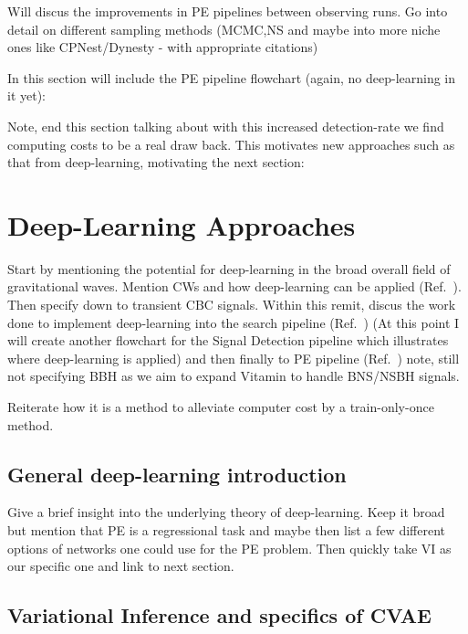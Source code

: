\documentclass[11pt]{article}
\begin{document}
Will discus the improvements in PE pipelines between observing runs. Go into detail on different sampling methods (MCMC,NS and maybe into more niche ones like CPNest/Dynesty \-- with appropriate citations)

In this section will include the PE pipeline flowchart (again, no deep-learning in it yet):


Note, end this section talking about with this increased detection-rate we find computing costs to be a real draw back. This motivates new approaches such as that from deep-learning, motivating the next section:


\section{Deep-Learning Approaches}


Start by mentioning the potential for deep-learning in the broad overall field of gravitational waves. Mention CWs and how deep-learning can be applied (Ref.~\cite{ml_cws}). Then specify down to transient CBC signals. Within this remit, discus the work done to implement deep-learning into the search pipeline (Ref.~\cite{gabbard2018matching}) (At this point I will create another flowchart for the Signal Detection pipeline which illustrates where deep-learning is applied) and then finally to PE pipeline (Ref.~\cite{vitpaper}) note, still not specifying BBH as we aim to expand Vitamin to handle BNS/NSBH signals.

Reiterate how it is a method to alleviate computer cost by a train-only-once method.

\subsection{General deep-learning introduction}

Give a brief insight into the underlying theory of deep-learning. Keep it broad but mention that PE is a regressional task and maybe then list a few different options of networks one could use for the PE problem. Then quickly take VI as our specific one and link to next section.

\subsection{Variational Inference and specifics of CVAE}
\end{document}
